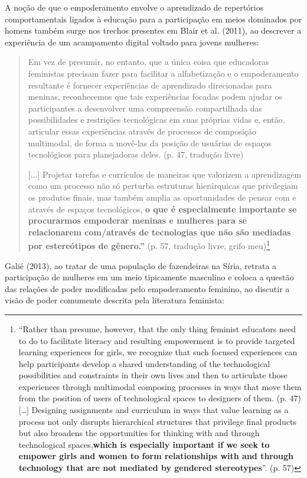 A noção de que o empoderamento envolve o aprendizado de repertórios comportamentais ligados à educação para a participação em meios dominados por homens também surge nos trechos presentes em Blair et al. (2011), ao descrever a experiência de um acampamento digital voltado para jovens mulheres:

\begin{quote}
    Em vez de presumir, no entanto, que a única coisa que educadoras feministas precisam fazer para facilitar a alfabetização e o empoderamento resultante é fornecer experiências de aprendizado direcionadas para meninas, reconhecemos que tais experiências focadas podem ajudar os participantes a desenvolver uma compreensão compartilhada das possibilidades e restrições tecnológicas em suas próprias vidas e, então, articular essas experiências através de processos de composição multimodal, de forma a movê-las da posição de usuárias de espaços tecnológicos para planejadoras deles. (p. 47, tradução livre) 

    [...] Projetar tarefas e currículos de maneiras que valorizem a aprendizagem como um processo não só perturba estruturas hierárquicas que privilegiam os produtos finais, mas também amplia as oportunidades de pensar com e através de espaços tecnológicos, \textbf{o que é especialmente importante se procurarmos empoderar meninas e mulheres para se relacionarem com/através de tecnologias que não são mediadas por estereótipos de gênero.''} (p. 57, tradução livre, grifo meu)\footnote{``Rather than presume, however, that the only thing feminist educators need to do to facilitate literacy and resulting empowerment is to provide targeted learning experiences for girls, we recognize that such focused experiences can help participants develop a shared understanding of the technological possibilities and constraints in their own lives and then to articulate those experiences through multimodal composing processes in ways that move them from the position of users of technological spaces to designers of them. (p. 47) […] Designing assignments and curriculum in ways that value learning as a process not only disrupts hierarchical structures that privilege final products but also broadens the opportunities for thinking with and through technological spaces,\textbf{which is especially important if we seek to empower girls and women to form relationships with and through technology that are not mediated by gendered stereotypes}''. (p. 57)}
\end{quote}

Galié (2013), ao tratar de uma população de fazendeiras na Síria, retrata a participação de mulheres em um meio tipicamente masculino e coloca a questão das relações de poder modificadas pelo empoderamento feminino, ao discutir a visão de poder comumente descrita pela literatura feminista:

